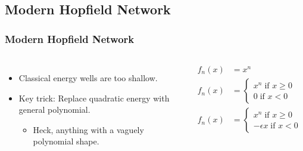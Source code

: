 
\subsection{Modern Hopfield Network} 

\begin{frame}
	
    \frametitle{Modern Hopfield Network}
    \begin{columns}[c]
        \begin{itemize}
            \item Classical energy wells are too shallow.
            \item Key trick: Replace quadratic energy with general polynomial.
            \begin{itemize}
                \item Heck, anything with a vaguely polynomial shape.
            \end{itemize}
        \end{itemize}

        \begin{align*}
            f_n\left( x \right) &= x^n \\
            f_n\left( x \right) &= \begin{cases}
                x^n \; \text{if } x\geq0 \\
                0 \; \text{if } x<0
            \end{cases} \\
            f_n\left( x \right) &= \begin{cases}
                x^n \; \text{if } x\geq0 \\
                -\epsilon x \; \text{if } x<0
            \end{cases}
        \end{align*}

        
    \end{columns}
\end{frame}


